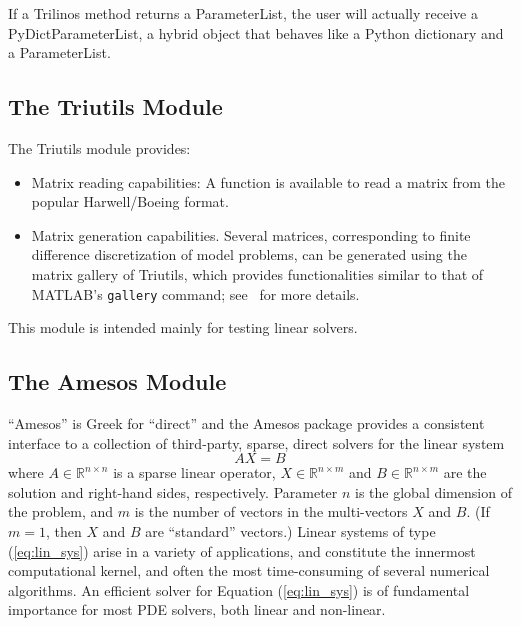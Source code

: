 \documentclass[acmtocl]{acmtrans2m}
\begin{document}
If a Trilinos method returns a ParameterList, the user will actually
receive a PyDictParameterList, a hybrid object that behaves like a
Python dictionary and a ParameterList.

\subsection{The Triutils Module}
\label{subsec:triutils}

The Triutils module provides:
\begin{itemize}

\item Matrix reading capabilities: A function is available to read a
  matrix from the popular Harwell/Boeing format.

\item Matrix generation capabilities.  Several matrices, corresponding
  to finite difference discretization of model problems, can be
  generated using the matrix gallery of Triutils, which provides
  functionalities similar to that of MATLAB's {\tt gallery} command;
  see~\cite[Chapter 5]{Trilinos-tutorial} for more details.

\end{itemize}

This module is intended mainly for testing linear solvers.

\subsection{The Amesos Module}
\label{subsec:amesos}

``Amesos'' is Greek for ``direct'' and the Amesos package provides a
consistent interface to a collection of third-party, sparse, direct
solvers for the linear system
\begin{equation}
  \label{eq:lin_sys}
  A X = B
\end{equation}
where $A \in \mathbb{R}^{n \times n}$ is a sparse linear operator, $X
\in \mathbb{R}^{n \times m}$ and $B \in \mathbb{R}^{n \times m}$ are
the solution and right-hand sides, respectively.  Parameter $n$ is the
global dimension of the problem, and $m$ is the number of vectors in
the multi-vectors $X$ and $B$.  (If $m = 1$, then $X$ and $B$ are
``standard'' vectors.)  Linear systems of type (\ref{eq:lin_sys})
arise in a variety of applications, and constitute the innermost
computational kernel, and often the most time-consuming of several
numerical algorithms.  An efficient solver for Equation
(\ref{eq:lin_sys}) is of fundamental importance for most PDE solvers,
both linear and non-linear.
\end{document}
